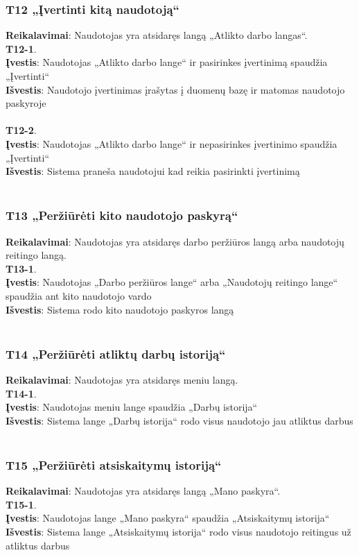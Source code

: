 \documentclass{VUMIFPSbakalaurinis}
\begin{document}
\subsubsection{T12 „Įvertinti kitą naudotoją“}
\textbf{Reikalavimai}: Naudotojas yra atsidaręs langą „Atlikto darbo langas“. \\
\textbf{T12-1}. \\
\textbf{Įvestis}: Naudotojas  „Atlikto darbo lange“ ir pasirinkes įvertinimą spaudžia „Įvertinti“\\
\textbf{Išvestis}: Naudotojo įvertinimas įrašytas į duomenų bazę ir matomas naudotojo paskyroje\\ \\
\textbf{T12-2}. \\
\textbf{Įvestis}:  Naudotojas  „Atlikto darbo lange“ ir nepasirinkes įvertinimo spaudžia „Įvertinti“\\
\textbf{Išvestis}: Sistema praneša naudotojui kad reikia pasirinkti įvertinimą\\ \\

\subsubsection{T13 „Peržiūrėti kito naudotojo paskyrą“}
\textbf{Reikalavimai}: Naudotojas yra atsidaręs darbo peržiūros langą arba naudotojų reitingo langą. \\
\textbf{T13-1}. \\
\textbf{Įvestis}: Naudotojas „Darbo peržiūros lange“ arba „Naudotojų reitingo lange“ spaudžia ant kito naudotojo vardo\\
\textbf{Išvestis}: Sistema rodo kito naudotojo paskyros langą\\ \\

\subsubsection{T14 „Peržiūrėti atliktų darbų istoriją“}
\textbf{Reikalavimai}: Naudotojas yra atsidaręs meniu langą. \\
\textbf{T14-1}. \\
\textbf{Įvestis}: Naudotojas meniu lange spaudžia „Darbų istorija“\\
\textbf{Išvestis}: Sistema lange „Darbų istorija“ rodo visus naudotojo jau atliktus darbus\\ \\

\subsubsection{T15 „Peržiūrėti atsiskaitymų istoriją“}
\textbf{Reikalavimai}: Naudotojas yra atsidaręs langą „Mano paskyra“. \\
\textbf{T15-1}. \\
\textbf{Įvestis}: Naudotojas lange „Mano paskyra“ spaudžia „Atsiskaitymų istorija“\\
\textbf{Išvestis}: Sistema lange „Atsiskaitymų istorija“ rodo visus naudotojo reitingus už atliktus darbus\\ \\
\end{document}
